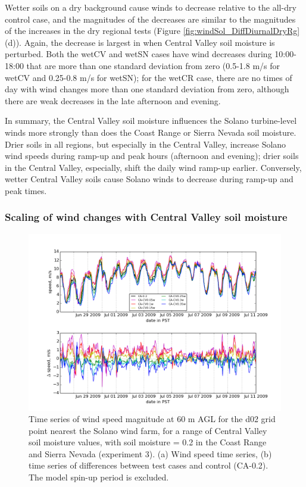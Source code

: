 Wetter soils on a dry background cause winds to decrease relative to the all-dry control case, and the magnitudes of the decreases are similar to the magnitudes of the increases in the dry regional tests (Figure \ref{fig:windSol_DiffDiurnalDryRg}(d)).  Again, the decrease is largest in when Central Valley soil moisture is perturbed.  Both the wetCV and wetSN cases have wind decreases during 10:00-18:00 that are more than one standard deviation from zero (0.5-1.8 m/s for wetCV and 0.25-0.8 m/s for wetSN); for the wetCR case, there are no times of day with wind changes more than one standard deviation from zero, although there are weak decreases in the late afternoon and evening.

In summary, the Central Valley soil moisture influences the Solano turbine-level winds more strongly than does the Coast Range or Sierra Nevada soil moisture.  Drier soils in all regions, but especially in the Central Valley, increase Solano wind speeds during ramp-up and peak hours (afternoon and evening); drier soils in the Central Valley, especially, shift the daily wind ramp-up earlier.  Conversely, wetter Central Valley soils cause Solano winds to decrease during ramp-up and peak times.

\subsubsection{Scaling of wind changes with Central Valley soil moisture}

\begin{figure}[here]
\includegraphics[width=1\textwidth]{ch3-wind/img/solano_wind_CV0pt2_d02_level0.png}
\caption{Time series of wind speed magnitude at 60 m AGL for the d02 grid point nearest the Solano wind farm, for a range of Central Valley soil moisture values, with soil moisture = 0.2 in the Coast Range and Sierra Nevada (experiment 3).  (a) Wind speed time series, (b) time series of differences between test cases and control (CA-0.2).  The model spin-up period is excluded.}
\label{fig:windSol_TseriesWindCV}
\end{figure}

